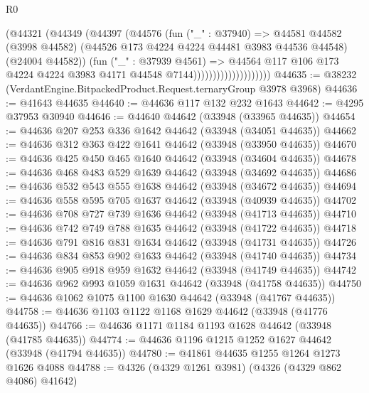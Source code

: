 \begin{lexlean}{R0}
\begin{coremodule}
                                  (@44321
                                    (@44349
                                      (@44397
                                        (@44576
                                          (fun ("_" : @37940) =>
                                          @44581
                                            @44582
                                            (@3998 @44582)
                                            (@44526 @173 @4224 @4224 @44481 @3983 @44536 @44548)
                                            (@24004 @44582))
                                          (fun ("_" : @37939 @4561) =>
                                          @44564
                                            @117
                                            @106
                                            @173
                                            @4224
                                            @4224
                                            @3983
                                            @4171
                                            @44548
                                            @7144))))))))))))))))))))
@44635 := @38232 (VerdantEngine.BitpackedProduct.Request.ternaryGroup @3978 @3968)
@44636 := @41643 @44635
@44640 := @44636 @117 @132 @232 @1643
@44642 := @4295 @37953 @30940
@44646 := @44640 @44642 (@33948 (@33965 @44635))
@44654 := @44636 @207 @253 @336 @1642 @44642 (@33948 (@34051 @44635))
@44662 := @44636 @312 @363 @422 @1641 @44642 (@33948 (@33950 @44635))
@44670 := @44636 @425 @450 @465 @1640 @44642 (@33948 (@34604 @44635))
@44678 := @44636 @468 @483 @529 @1639 @44642 (@33948 (@34692 @44635))
@44686 := @44636 @532 @543 @555 @1638 @44642 (@33948 (@34672 @44635))
@44694 := @44636 @558 @595 @705 @1637 @44642 (@33948 (@40939 @44635))
@44702 := @44636 @708 @727 @739 @1636 @44642 (@33948 (@41713 @44635))
@44710 := @44636 @742 @749 @788 @1635 @44642 (@33948 (@41722 @44635))
@44718 := @44636 @791 @816 @831 @1634 @44642 (@33948 (@41731 @44635))
@44726 := @44636 @834 @853 @902 @1633 @44642 (@33948 (@41740 @44635))
@44734 := @44636 @905 @918 @959 @1632 @44642 (@33948 (@41749 @44635))
@44742 := @44636 @962 @993 @1059 @1631 @44642 (@33948 (@41758 @44635))
@44750 := @44636 @1062 @1075 @1100 @1630 @44642 (@33948 (@41767 @44635))
@44758 := @44636 @1103 @1122 @1168 @1629 @44642 (@33948 (@41776 @44635))
@44766 := @44636 @1171 @1184 @1193 @1628 @44642 (@33948 (@41785 @44635))
@44774 := @44636 @1196 @1215 @1252 @1627 @44642 (@33948 (@41794 @44635))
@44780 := @41861 @44635 @1255 @1264 @1273 @1626 @4088
@44788 := @4326 (@4329 @1261 @3981) (@4326 (@4329 @862 @4086) @41642)

\end{coremodule}
\end{lexlean}
